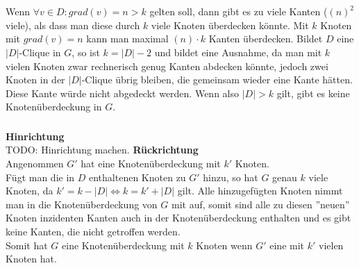 \documentclass[a4paper]{article}
\begin{document}
	\maketitle
	\section{}
		\subsection{}
		\subsection{}
	\section{}
		\subsubsection{}
			Wenn $\forall v\in D: grad(v)=n>k$ gelten soll, dann gibt es zu viele Kanten ($(n)^2$ viele), als dass man diese durch $k$ viele Knoten überdecken könnte.
			Mit $k$ Knoten mit $grad(v)=n$ kann man maximal $(n)\cdot k$ Kanten überdecken.\n
			Bildet $D$ eine $|D|$-Clique in $G$, so ist $k=|D|-2$ und bildet eine Ausnahme, da man mit $k$ vielen Knoten zwar rechnerisch genug Kanten abdecken könnte, jedoch zwei Knoten in der $|D|$-Clique übrig bleiben, die gemeinsam wieder eine Kante hätten.
			Diese Kante würde nicht abgedeckt werden.\n
			Wenn also $|D|>k$ gilt, gibt es keine Knotenüberdeckung in $G$.
		\subsubsection{}
			\textbf{Hinrichtung}\\
			TODO: Hinrichtung machen.\n
			\textbf{Rückrichtung}\\
			Angenommen $G'$ hat eine Knotenüberdeckung mit $k'$ Knoten.\\
			Fügt man die in $D$ enthaltenen Knoten zu $G'$ hinzu, so hat $G$ genau $k$ viele Knoten, da $k'=k-|D| \Leftrightarrow k=k'+|D|$ gilt.
			Alle hinzugefügten Knoten nimmt man in die Knotenüberdeckung von $G$ mit auf, somit sind alle zu diesen ''neuen'' Knoten inzidenten Kanten auch in der Knotenüberdeckung enthalten und es gibt keine Kanten, die nicht getroffen werden.\\
			Somit hat $G$ eine Knotenüberdeckung mit $k$ Knoten wenn $G'$ eine mit $k'$ vielen Knoten hat.
\end{document}
